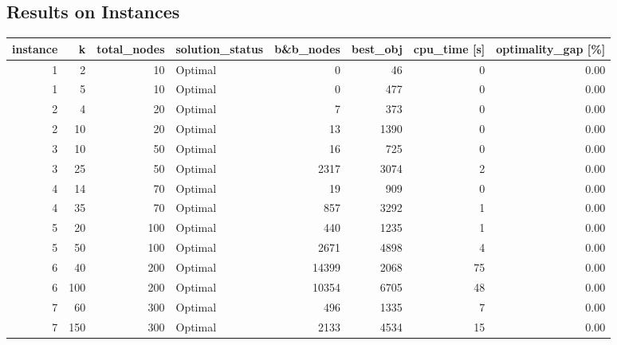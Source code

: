 \documentclass[11pt]{article}
\begin{document}
\subsection{Results on Instances}
\begin{tabular}{rrrlrrrr}
\toprule
 instance &     k &  total\_nodes & solution\_status &  b\&b\_nodes &  best\_obj &  cpu\_time [s] &  optimality\_gap [\%] \\
\midrule
        1 &     2 &           10 &         Optimal &          0 &        46 &             0 &                0.00 \\
        1 &     5 &           10 &         Optimal &          0 &       477 &             0 &                0.00 \\
        2 &     4 &           20 &         Optimal &          7 &       373 &             0 &                0.00 \\
        2 &    10 &           20 &         Optimal &         13 &      1390 &             0 &                0.00 \\
        3 &    10 &           50 &         Optimal &         16 &       725 &             0 &                0.00 \\
        3 &    25 &           50 &         Optimal &       2317 &      3074 &             2 &                0.00 \\
        4 &    14 &           70 &         Optimal &         19 &       909 &             0 &                0.00 \\
        4 &    35 &           70 &         Optimal &        857 &      3292 &             1 &                0.00 \\
        5 &    20 &          100 &         Optimal &        440 &      1235 &             1 &                0.00 \\
        5 &    50 &          100 &         Optimal &       2671 &      4898 &             4 &                0.00 \\
        6 &    40 &          200 &         Optimal &      14399 &      2068 &            75 &                0.00 \\
        6 &   100 &          200 &         Optimal &      10354 &      6705 &            48 &                0.00 \\
        7 &    60 &          300 &         Optimal &        496 &      1335 &             7 &                0.00 \\
        7 &   150 &          300 &         Optimal &       2133 &      4534 &            15 &                0.00 \\

\end{tabular}
\end{document}
